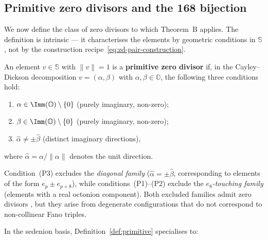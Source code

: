 

\subsection{Primitive zero divisors and the 168 bijection}
\label{sec:primitive-zd}

We now define the class of zero divisors to which Theorem~B applies.  The
definition is intrinsic --- it characterises the elements by geometric
conditions in $\mathbb{S}$, not by the construction
recipe~\eqref{eq:zd-pair-construction}.

\begin{definition}\label{def:primitive}
An element $v\in\mathbb{S}$ with $\|v\|=1$ is a \textbf{primitive zero
divisor} if, in the Cayley--Dickson decomposition $v = (\alpha,\beta)$ with
$\alpha,\beta\in\mathbb{O}$, the following three conditions hold:
\begin{enumerate}
\item[\textup{(P1)}] $\alpha\in\Imm(\mathbb{O})\setminus\{0\}$
  \quad (purely imaginary, non-zero);
\item[\textup{(P2)}] $\beta\in\Imm(\mathbb{O})\setminus\{0\}$
  \quad (purely imaginary, non-zero);
\item[\textup{(P3)}] $\hat\alpha \neq \pm\hat\beta$
  \quad (distinct imaginary directions),
\end{enumerate}
where $\hat\alpha = \alpha/\|\alpha\|$ denotes the unit direction.
\end{definition}

\begin{remark}\label{rem:exclusions}
Condition~(P3) excludes the \emph{diagonal family} ($\hat\alpha =
\pm\hat\beta$, corresponding to elements of the form $e_p \pm
e_{p+8}$), while conditions~(P1)--(P2) exclude the
\emph{$e_8$-touching family} (elements with a real octonion component).
Both excluded families admit zero divisors
\cite{BissDuggerIsaksen2008}, but they arise from degenerate
configurations that do not correspond to non-collinear Fano triples.
\end{remark}

In the sedenion basis, Definition~\ref{def:primitive} specialises to:

